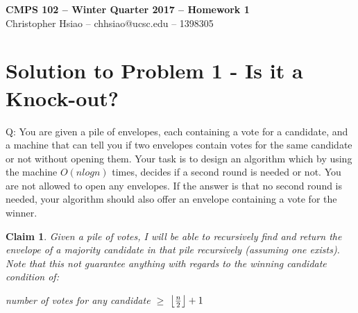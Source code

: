 \documentclass[11pt]{article}
\DeclarePairedDelimiter\floor{\lfloor}{\rfloor}
\newtheorem{claim}[theorem]{Claim}
\begin{document}
\begin{center}
{\bf\Large CMPS 102 -- Winter Quarter 2017 --  Homework 1}\\
Christopher Hsiao -- chhsiao@ucsc.edu -- 1398305
\end{center}

\section*{Solution to Problem 1 - Is it a Knock-out?}
Q: 
You are given a pile of envelopes, each containing a vote for a candidate, and a machine that can tell you if two envelopes contain votes for the same candidate or not without opening them. Your task is to design an algorithm which by using the machine $O(nlogn)$ times, decides if a second round is needed or not. You are not allowed to open any envelopes. If the answer is that no second round is needed, your algorithm should also offer an envelope containing a vote for the winner.
\begin{claim} 
Given a pile of votes, I will be able to recursively find and return the envelope of a majority candidate in that pile recursively (assuming one exists). Note that this not guarantee anything with regards to the winning candidate condition of: 
	\begin{center}
		number of votes for any candidate $\geq$ $\floor*{\frac{n}{2}} + 1$
	\end{center}
\end{claim}
\end{document}
